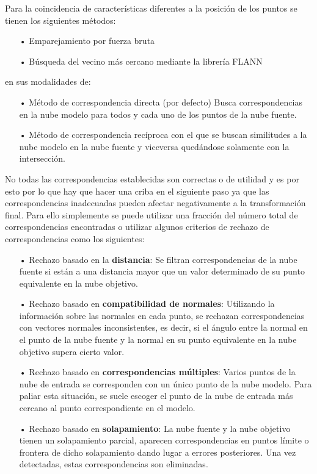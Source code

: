 Para la coincidencia de características diferentes a la posición de los puntos se tienen los siguientes métodos: 
\begin{itemize}
\item[•]Emparejamiento por fuerza bruta
\item[•]Búsqueda del vecino más cercano mediante la librería FLANN
\end{itemize}
en sus modalidades de:
\begin{itemize}
\item[•]Método de correspondencia directa (por defecto) Busca correspondencias en la nube modelo para todos y cada uno de los puntos de la nube fuente.
\item[•]Método de correspondencia recíproca con el que se buscan similitudes a la nube modelo en la nube fuente y viceversa quedándose solamente con la intersección.
\end{itemize}

No todas las correspondencias establecidas son correctas o de utilidad y es por esto por lo que hay que hacer una criba en el siguiente paso ya que las correspondencias inadecuadas pueden afectar negativamente a la transformación final. Para ello simplemente se puede utilizar una fracción del número total de correspondencias encontradas o utilizar algunos criterios de rechazo de correspondencias como los siguientes:

\begin{itemize}
\item[•]Rechazo basado en la \textbf{distancia}:
Se filtran correspondencias de la nube fuente si están a una distancia mayor que un valor determinado de su punto equivalente en la nube objetivo.
\item[•]Rechazo basado en \textbf{compatibilidad de normales}:
Utilizando la información sobre las normales en cada punto, se rechazan correspondencias con vectores normales inconsistentes, es decir, si el ángulo entre la normal en el punto de la nube fuente y la normal en su punto equivalente en la nube objetivo supera cierto valor.
\item[•]Rechazo basado en \textbf{correspondencias múltiples}: 
Varios puntos de la nube de entrada se corresponden con un único punto de la nube modelo. Para paliar esta situación, se suele escoger el punto de la nube de entrada más cercano al punto correspondiente en el modelo.
\item[•]Rechazo basado en \textbf{solapamiento}:
La nube fuente y la nube objetivo tienen un solapamiento parcial, aparecen correspondencias en puntos límite o frontera de dicho solapamiento dando lugar a errores posteriores. Una vez detectadas, estas correspondencias son eliminadas. 
\end{itemize}

